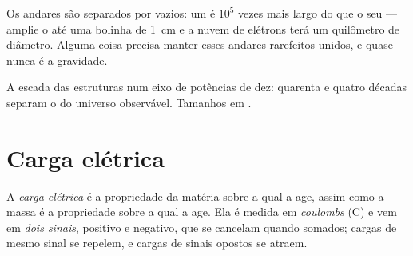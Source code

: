 \begin{remark}\label{rem:g11:fundamental-interactions:empty}
Os andares são separados por vazios: um  é $10^{5}$ vezes mais largo
do que o seu  --- amplie o  até uma bolinha de \qty{1}{cm} e
a nuvem de elétrons terá um quilômetro de diâmetro. Alguma coisa precisa
manter esses andares rarefeitos unidos, e quase nunca é a gravidade.
\end{remark}

\begin{omfigure}

{\small A escada das estruturas num eixo de potências de dez: quarenta e
quatro décadas separam o  do universo observável. Tamanhos em
.}
\end{omfigure}

\section{Carga elétrica}

\begin{definition}\label{def:g11:fundamental-interactions:charge}
A \emph{carga elétrica} é a propriedade da matéria
sobre a qual a  age, assim como a massa é a
propriedade sobre a qual a  age. Ela é medida em
\emph{coulombs} (\unit{C}) e vem em \emph{dois sinais},
positivo e negativo, que se cancelam quando somados; cargas de mesmo
sinal se repelem, e cargas de sinais opostos se atraem.
\end{definition}

